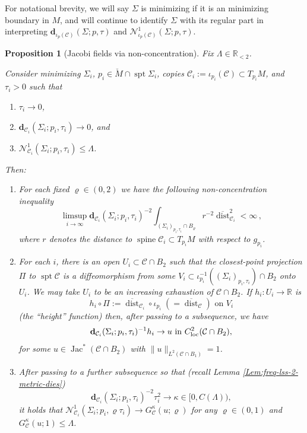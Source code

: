 \documentclass[11pt, letterpaper, reqno]{amsart}
\numberwithin{equation}{section}
\newtheorem{Prop}[Def]{Proposition}
\theoremstyle{remark}
\newcommand{\RR}{\mathbb{R}}
\newcommand{\cC}{\mathcal{C}}
\newcommand{\cN}{\mathcal{N}}
\newcommand{\mbfd}{\mathbf{d}}
\newcommand{\spt}{\operatorname{spt}}
\newcommand{\dist}{\operatorname{dist}}
\newcommand{\Jac}{\operatorname{Jac}}
\newcommand{\spine}{\operatorname{spine}}
\newcommand{\Sdist}{\overline{\dist}}
\begin{document}
For notational brevity, we will say $\Sigma$ is minimizing if it is an minimizing boundary in $M$, and will continue to identify $\Sigma$ with its regular part in interpreting $\mbfd_{\iota_p(\cC)}(\Sigma; p, \tau)$ and $\cN^{1}_{\iota_p(\cC)}(\Sigma; p, \tau)$.
 
\begin{Prop}[Jacobi fields via non-concentration]\label{Prop:nonconc-Jac}
Fix $\Lambda \in \RR_{< 2}$.

Consider minimizing $\Sigma_i$, $p_i \in \breve M \cap \spt \Sigma_i$, copies $\cC_i := \iota_{p_i}(\cC) \subset T_{p_i} M$, and $\tau_i > 0$ such that
\begin{enumerate}
\item $\tau_i \to 0$,
\item $\mbfd_{\cC_i}(\Sigma_i;p_i,\tau_i) \to 0$, and
\item $\cN^{1}_{\cC_i}(\Sigma_i;p_i,\tau_i) \leq \Lambda$.
\end{enumerate}
Then:
\begin{enumerate}
	\item[(i)] For each fixed $\varrho \in (0,2)$ we have the following non-concentration inequality
		\[
		\limsup_{i\to\infty} \mbfd_{\cC_i}(\Sigma_i;p_i,\tau_i)^{-2} \int_{(\Sigma_i)_{p_i,\tau_i} \cap B_\varrho}  r^{-2}\Sdist_{\cC_i}^2 <\infty \, ,
		\]
		where $r$ denotes the distance to $\spine \cC_i \subset T_{p_i} M$ with respect to $g_{p_i}$.
	\item[(ii)] For each $i$, there is an open $U_i \subset \cC \cap B_2$ such that the closest-point projection $\Pi$ to $\spt \cC$ is a diffeomorphism from some $V_i \subset \iota_{p_i}^{-1} ((\Sigma_i)_{p_i, \tau_i}) \cap B_2$ onto $U_i$. We may take $U_i$ to be an increasing exhaustion of $\cC \cap B_2$. If $h_i : U_i \to \RR$ is 
		\[ h_i \circ \Pi := \Sdist_{\cC_i} \circ \iota_{p_i} \; (= \Sdist_{\cC}) \text{ on } V_i \]
		(the ``height'' function) then, after passing to a subsequence, we have
		\[
		\mbfd_{\cC_i}(\Sigma_i;p_i,\tau_i)^{-1} h_i \to u \text{ in } C^2_\textnormal{loc}(\cC \cap B_2),
		\]
		for some $u \in \Jac^*(\cC \cap B_2)$ with $\|u\|_{L^2(\cC \cap B_1)} = 1$. 
	\item[(iii)] After passing to a further subsequence so that (recall Lemma \ref{Lem:freq-lss-2-metric-dies})
		\[ \mbfd_{\cC_i}(\Sigma_i;p_i,\tau_i)^{-2} \tau_i^2 \to \kappa \in [0,C(\Lambda)), \]
		it holds that $\cN^{1}_{\cC_i}(\Sigma_i; p_i, \varrho \tau_i) \to G^\kappa _\cC(u;\varrho)$ for any $\varrho \in (0, 1)$ and $G_{\cC}^\kappa (u;1) \leq \Lambda$.
\end{enumerate}
\end{Prop}
\end{document}
